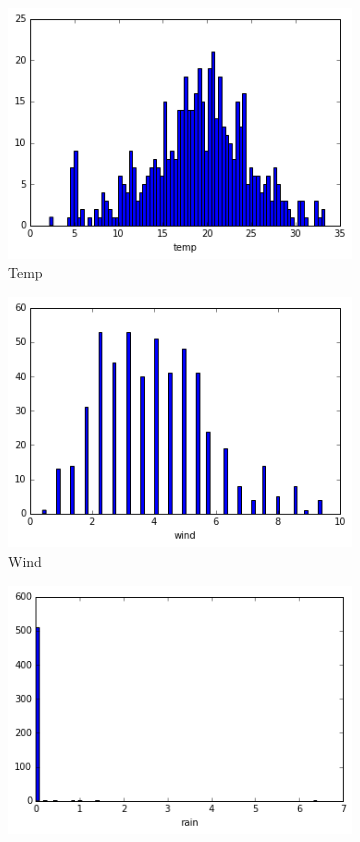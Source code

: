 \begin{figure}[!ht]
\begin{subfigure}[b]{.45\linewidth}
\includegraphics[width=\linewidth]{fig/hist/temp.png}
\caption{Temp}\label{fig:gull}
\end{subfigure}
\begin{subfigure}[b]{.45\linewidth}
\includegraphics[width=\linewidth]{fig/hist/wind.png}
\caption{Wind}\label{fig:tiger}
\end{subfigure}
\begin{subfigure}[b]{.45\linewidth}
\includegraphics[width=\linewidth]{fig/hist/rain.png}

\end{subfigure}
\end{figure}
